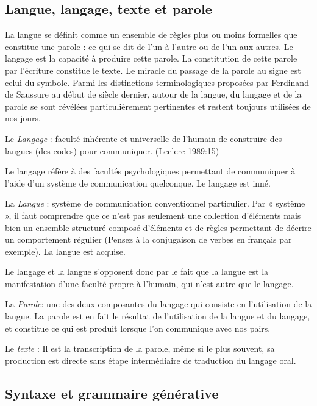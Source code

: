 \documentclass[
  letterpaper,
  DIV=11,
  numbers=noendperiod]{scrreprt}
\begin{document}
\subsection{Langue, langage, texte et
parole}\label{langue-langage-texte-et-parole}

La langue se définit comme un ensemble de règles plus ou moins formelles
que constitue une parole : ce qui se dit de l'un à l'autre ou de l'un
aux autres. Le langage est la capacité à produire cette parole. La
constitution de cette parole par l'écriture constitue le texte. Le
miracle du passage de la parole au signe est celui du symbole. Parmi les
distinctions terminologiques proposées par Ferdinand de Saussure au
début de siècle dernier, autour de la langue, du langage et de la parole
se sont révélées particulièrement pertinentes et restent toujours
utilisées de nos jours.

Le \emph{Langage} : faculté inhérente et universelle de l'humain de
construire des langues (des codes) pour communiquer. (Leclerc 1989:15)

Le langage réfère à des facultés psychologiques permettant de
communiquer à l'aide d'un système de communication quelconque. Le
langage est inné.

La \emph{Langue} : système de communication conventionnel particulier.
Par « système », il faut comprendre que ce n'est pas seulement une
collection d'éléments mais bien un ensemble structuré composé d'éléments
et de règles permettant de décrire un comportement régulier (Pensez à la
conjugaison de verbes en français par exemple). La langue est acquise.

Le langage et la langue s'opposent donc par le fait que la langue est la
manifestation d'une faculté propre à l'humain, qui n'est autre que le
langage.

La \emph{Parole}: une des deux composantes du langage qui consiste en
l'utilisation de la langue. La parole est en fait le résultat de
l'utilisation de la langue et du langage, et constitue ce qui est
produit lorsque l'on communique avec nos pairs.

Le \emph{texte} : Il est la transcription de la parole, même si le plus
souvent, sa production est directe sans étape intermédiaire de
traduction du langage oral.

\subsection{Syntaxe et grammaire
générative}\label{syntaxe-et-grammaire-guxe9nuxe9rative}
\end{document}
